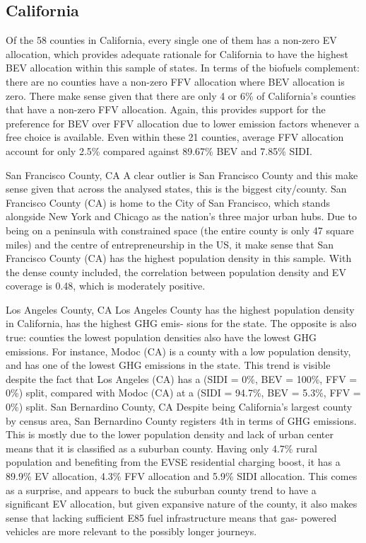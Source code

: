 \documentclass[answers]{exam}
\begin{document}
\subsection{California}
Of the 58 counties in California, every single one of them has a non-zero EV allocation, which provides adequate rationale for California to have the highest BEV allocation within this sample of states. In terms of the biofuels complement: there are no counties have a non-zero FFV allocation where BEV allocation is zero. There make sense given that there are only 4 or 6\% of California's counties that have a non-zero FFV allocation. Again, this provides support for the preference for BEV over FFV allocation due to lower emission factors whenever a free choice is available. Even within these 21 counties, average FFV allocation account for only 2.5\% compared against 89.67\% BEV and 7.85\% SIDI.
\begin{outline}
\1 San Francisco County, CA
\2 A clear outlier is San Francisco County and this make sense given that across the analysed states, this is the biggest city/county. San Francisco County (CA) is home to the City of San Francisco, which stands alongside New York and Chicago as the nation's three major urban hubs. Due to being on a peninsula with constrained space (the entire county is only 47 square miles) and the centre of entrepreneurship in the US, it make sense that San Francisco County (CA) has the highest population density in this sample. With the dense county included, the correlation between population density and EV coverage is 0.48, which is moderately positive.

\1 Los Angeles County, CA
\2 Los Angeles County has the highest population density in California, has the highest GHG emis- sions for the state. The opposite is also true: counties the lowest population densities also have the lowest GHG emissions. For instance, Modoc (CA) is a county with a low population density, and has one of the lowest GHG emissions in the state. This trend is visible despite the fact that Los Angeles (CA) has a (SIDI = 0\%, BEV = 100\%, FFV = 0\%) split, compared with Modoc (CA) at a (SIDI = 94.7\%, BEV = 5.3\%, FFV = 0\%) split.
\1 San Bernardino County, CA
\2 Despite being California's largest county by census area, San Bernardino County registers 4th in terms of GHG emissions. This is mostly due to the lower population density and lack of urban center means that it is classified as a suburban county. Having only 4.7\% rural population and benefiting from the EVSE residential charging boost, it has a 89.9\% EV allocation, 4.3\% FFV allocation and 5.9\% SIDI allocation. This comes as a surprise, and appears to buck the suburban county trend to have a significant EV allocation, but given expansive nature of the county, it also makes sense that lacking sufficient E85 fuel infrastructure means that gas- powered vehicles are more relevant to the possibly longer journeys.
\end{outline}
\newpage
\newpage
\end{document}

